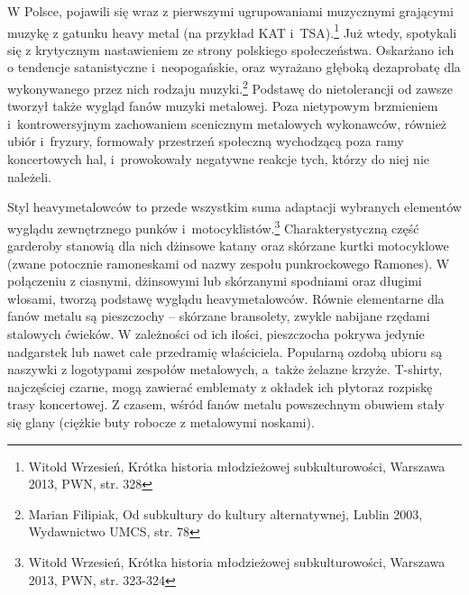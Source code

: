 \documentclass[12pt, a4paper, titlepage]{report}
\begin{document}
W Polsce, pojawili się wraz z pierwszymi ugrupowaniami muzycznymi grającymi muzykę z gatunku heavy metal (na przykład KAT i~TSA).\footnote{Witold Wrzesień, Krótka historia młodzieżowej subkulturowości, Warszawa 2013, PWN, str. 328} Już wtedy, spotykali się z krytycznym nastawieniem ze strony polskiego społeczeństwa. Oskarżano ich o tendencje satanistyczne i~neopogańskie, oraz wyrażano głęboką dezaprobatę dla wykonywanego przez nich rodzaju muzyki.\footnote{Marian Filipiak, Od subkultury do kultury alternatywnej, Lublin 2003, Wydawnictwo UMCS, str. 78} %
Podstawę do nietolerancji od zawsze tworzył także wygląd fanów muzyki metalowej. Poza nietypowym brzmieniem i~kontrowersyjnym zachowaniem scenicznym metalowych wykonawców, również ubiór i~fryzury, formowały przestrzeń społeczną wychodzącą poza ramy koncertowych hal, i~prowokowały negatywne reakcje tych, którzy do niej nie należeli. 
 
Styl heavymetalowców to przede wszystkim suma adaptacji wybranych elementów wyglądu zewnętrznego punków i~motocyklistów.\footnote{Witold Wrzesień, Krótka historia młodzieżowej subkulturowości, Warszawa 2013, PWN, \break str. 323-324} Charakterystyczną \break część garderoby stanowią dla nich dżinsowe katany oraz skórzane kurtki motocyklowe (zwane potocznie ramoneskami od nazwy zespołu punkrockowego Ramones). W połączeniu z ciasnymi, dżinsowymi lub skórzanymi spodniami oraz długimi włosami, tworzą podstawę wyglądu heavymetalowców. Równie elementarne dla fanów metalu są pieszczochy -- skórzane bransolety, zwykle nabijane rzędami stalowych ćwieków. W zależności od ich ilości, pieszczocha pokrywa jedynie nadgarstek lub nawet całe przedramię właściciela. Popularną ozdobą ubioru są naszywki z logotypami zespołów metalowych, a~także żelazne krzyże. T-shirty, najczęściej czarne, mogą zawierać emblematy z okładek ich płyt\footnotemark[\value{footnote}] oraz rozpiskę trasy koncertowej. %
Z czasem, wśród fanów metalu powszechnym obuwiem stały się glany (ciężkie buty robocze z metalowymi noskami). 
\end{document}

